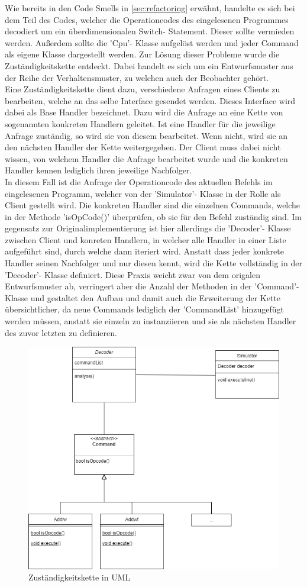 \documentclass[12pt,a4paper,titlepage,ngerman,pdftex]{report}
\begin{document}
    Wie bereits in den Code Smells in \autoref{sec:refactoring} erwähnt, handelte es sich bei dem Teil des Codes, welcher die Operationcodes des eingelesenen Programmes decodiert um ein überdimensionalen Switch- Statement.
    Dieser sollte vermieden werden. Außerdem sollte die 'Cpu'- Klasse aufgelöst werden und jeder Command als eigene Klasse dargestellt werden. Zur Lösung dieser Probleme wurde die Zuständigkeitskette entdeckt.
    Dabei handelt es sich um ein Entwurfsmuster aus der Reihe der Verhaltensmuster, zu welchen auch der Beobachter gehört. 
    \\
    Eine Zuständigkeitskette dient dazu, verschiedene Anfragen eines Clients zu bearbeiten, welche an das selbe Interface gesendet werden. Dieses Interface wird dabei als Base Handler bezeichnet. Dazu wird die Anfrage an eine Kette von sogenannten konkreten Handlern geleitet.
    Ist eine Handler für die jeweilige Anfrage zuständig, so wird sie von diesem bearbeitet. Wenn nicht, wird sie an den nächsten Handler der Kette weitergegeben. Der Client muss dabei nicht wissen, von welchem Handler die Anfrage bearbeitet wurde und die konkreten Handler kennen lediglich ihren jeweilige Nachfolger.
    \\
    In diesem Fall ist die Anfrage der Operationcode des aktuellen Befehls im eingelesenen Programm, welcher von der 'Simulator'- Klasse in der Rolle als Client gestellt wird. Die konkreten Handler sind die einzelnen Commands, welche in der Methode 'isOpCode()' überprüfen, ob sie für den Befehl zuständig sind.
    Im gegensatz zur Originalimplementierung ist hier allerdings die 'Decoder'- Klasse zwischen Client und konreten Handlern, in welcher alle Handler in einer Liste aufgeführt sind, durch welche dann iteriert wird. Anstatt dass jeder konkrete Handler seinen Nachfolger und nur diesen kennt, wird die Kette vollständig in der 'Decoder'- Klasse definiert.
    Diese Praxis weicht zwar von dem origalen Entwurfsmuster ab, verringert aber die Anzahl der Methoden in der 'Command'-Klasse und gestaltet den Aufbau und damit auch die Erweiterung der Kette übersichtlicher, da neue Commands lediglich der 'CommandList' hinzugefügt werden müssen,
    anstatt sie einzeln zu instanziieren und sie als nächsten Handler des zuvor letzten zu definieren.

    \begin{figure}
        \centering
        \includegraphics[width = .7 \linewidth]{"images/zustaendigkeitskette.png"}
        \caption{Zuständigkeitskette in UML}
    \end{figure}
\end{document}
